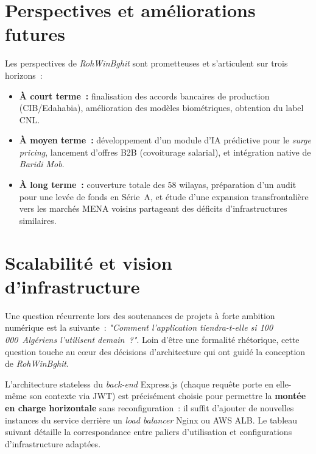 \documentclass[12pt, a4paper, oneside]{report}
\begin{document}
\section*{Perspectives et améliorations futures}

Les perspectives de \textit{RohWinBghit} sont prometteuses et s'articulent sur trois horizons~:
\begin{itemize}
  \item \textbf{À court terme~:} finalisation des accords bancaires de production (CIB/Edahabia), amélioration des modèles biométriques, obtention du label CNL.
  \item \textbf{À moyen terme~:} développement d'un module d'IA prédictive pour le \textit{surge pricing}, lancement d'offres B2B (covoiturage salarial), et intégration native de \textit{Baridi Mob}.
  \item \textbf{À long terme~:} couverture totale des 58 wilayas, préparation d'un audit pour une levée de fonds en Série~A, et étude d'une expansion transfrontalière vers les marchés MENA voisins partageant des déficits d'infrastructures similaires.
\end{itemize}

\section*{Scalabilité et vision d'infrastructure}

Une question récurrente lors des soutenances de projets à forte ambition numérique est la suivante~: \textit{"Comment l'application tiendra-t-elle si 100\,000~Algériens l'utilisent demain~?"}. Loin d'être une formalité rhétorique, cette question touche au cœur des décisions d'architecture qui ont guidé la conception de \textit{RohWinBghit}.

L'architecture stateless du \textit{back-end} Express.js (chaque requête porte en elle-même son contexte via JWT) est précisément choisie pour permettre la \textbf{montée en charge horizontale} sans reconfiguration~: il suffit d'ajouter de nouvelles instances du service derrière un \textit{load balancer} Nginx ou AWS ALB. Le tableau suivant détaille la correspondance entre paliers d'utilisation et configurations d'infrastructure adaptées.
\end{document}
